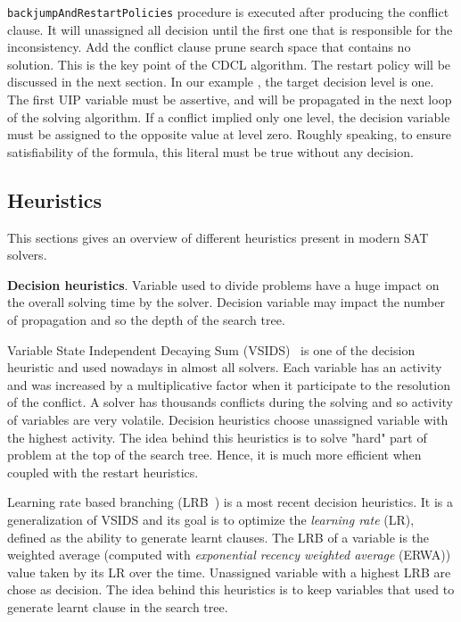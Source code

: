\texttt{backjumpAndRestartPolicies} procedure is executed after producing the conflict clause.
It will unassigned all
decision until the first one that is responsible for the inconsistency. Add the conflict clause prune search space that 
contains no solution. This is the key point of the CDCL algorithm. The restart policy will be discussed in the next section.
In our example , the target decision level is one. The first UIP variable must be assertive,
and will be propagated in the next loop of the solving algorithm.
If a conflict implied only one level, the decision variable must be assigned to the opposite value at level zero.
Roughly speaking, to ensure satisfiability of the formula, this literal must be true without any decision.

 
\subsection{Heuristics}\label{sec:heuristics}
This sections gives an overview of different heuristics present in modern SAT solvers.

\textbf{Decision heuristics}. Variable used to divide problems have a huge impact on the 
overall solving time by the solver. Decision variable may impact the number of propagation and so 
the depth of the search tree.

Variable State Independent Decaying Sum (VSIDS)~\cite{moskewicz2001chaff} is one of the decision heuristic and used
nowadays in almost all solvers. Each variable has an activity and was increased by a multiplicative factor 
when it participate to the resolution of the conflict.
A solver has thousands conflicts during the solving and so activity of variables are very volatile.
Decision heuristics choose unassigned variable with the highest activity.
The idea behind this heuristics is to solve "hard" part of problem at the top of the search tree.
Hence, it is much more efficient when coupled with the restart heuristics. 

Learning rate based branching (LRB~\cite{liang2016learning}) is a most recent decision heuristics. It is a
generalization of VSIDS and its goal is to optimize the \emph{learning rate} (LR), defined as the ability to generate
learnt clauses. The LRB of a variable is the weighted average (computed with \emph{exponential recency
weighted average} (ERWA))  value taken by its LR over the time. Unassigned variable with a highest LRB are chose as decision. The idea behind this heuristics is to keep variables that used to generate learnt clause in the search tree.


